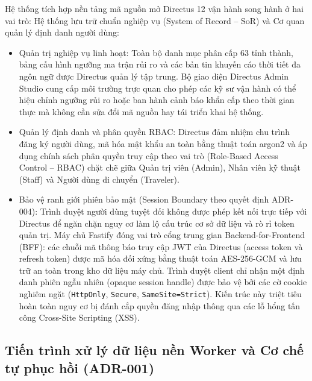 Hệ thống tích hợp nền tảng mã nguồn mở Directus 12 \cite{directus2024} vận hành song hành ở hai vai trò: Hệ thống lưu trữ chuẩn nghiệp vụ (System of Record -- SoR) và Cơ quan quản lý định danh người dùng:
\begin{itemize}
    \item[-] Quản trị nghiệp vụ linh hoạt: Toàn bộ danh mục phân cấp 63 tỉnh thành, bảng cấu hình ngưỡng ma trận rủi ro và các bản tin khuyến cáo thời tiết đa ngôn ngữ được Directus quản lý tập trung. Bộ giao diện Directus Admin Studio cung cấp môi trường trực quan cho phép các kỹ sư vận hành có thể hiệu chỉnh ngưỡng rủi ro hoặc ban hành cảnh báo khẩn cấp theo thời gian thực mà không cần sửa đổi mã nguồn hay tái triển khai hệ thống.
    \item[-] Quản lý định danh và phân quyền RBAC: Directus đảm nhiệm chu trình đăng ký người dùng, mã hóa mật khẩu an toàn bằng thuật toán argon2 và áp dụng chính sách phân quyền truy cập theo vai trò (Role-Based Access Control -- RBAC) chặt chẽ giữa Quản trị viên (Admin), Nhân viên kỹ thuật (Staff) và Người dùng di chuyển (Traveler).
    \item[-] Bảo vệ ranh giới phiên bảo mật (Session Boundary theo quyết định ADR-004): Trình duyệt người dùng tuyệt đối không được phép kết nối trực tiếp với Directus để ngăn chặn nguy cơ làm lộ cấu trúc cơ sở dữ liệu và rò rỉ token quản trị. Máy chủ Fastify đóng vai trò cổng trung gian Backend-for-Frontend (BFF): các chuỗi mã thông báo truy cập JWT của Directus (access token và refresh token) được mã hóa đối xứng bằng thuật toán AES-256-GCM và lưu trữ an toàn trong kho dữ liệu máy chủ. Trình duyệt client chỉ nhận một định danh phiên ngẫu nhiên (opaque session handle) được bảo vệ bởi các cờ cookie nghiêm ngặt (\texttt{HttpOnly}, \texttt{Secure}, \texttt{SameSite=Strict}). Kiến trúc này triệt tiêu hoàn toàn nguy cơ bị đánh cắp quyền đăng nhập thông qua các lỗ hổng tấn công Cross-Site Scripting (XSS).
\end{itemize}

\subsection{Tiến trình xử lý dữ liệu nền Worker và Cơ chế tự phục hồi (ADR-001)}

